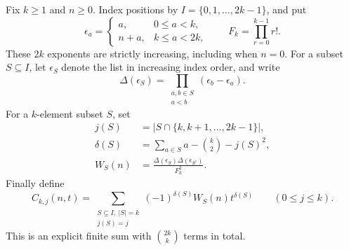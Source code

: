 \documentclass[11pt,a4paper]{article}
\theoremstyle{definition}
\theoremstyle{remark}
\numberwithin{equation}{section}
\begin{document}
Fix \(k\ge1\) and \(n\ge0\). Index positions by
\(I=\{0,1,\ldots,2k-1\}\), and put
\begin{equation}
 \epsilon_a=\begin{cases}a,&0\le a<k,\\ n+a,&k\le a<2k,\end{cases}
 \qquad F_k=\prod_{r=0}^{k-1}r!.
 \label{eq:epsilon}
\end{equation}
These \(2k\) exponents are strictly increasing, including when \(n=0\).
For a subset \(S\subseteq I\), let \(\epsilon_S\) denote the list in
increasing index order, and write
\[
 \Delta(\epsilon_S)=\prod_{\substack{a,b\in S\\a<b}}
 (\epsilon_b-\epsilon_a).
\]
For a \(k\)-element subset \(S\), set
\begin{align}
 j(S)&=|S\cap\{k,k+1,\ldots,2k-1\}|,\label{eq:jS}\\
 \delta(S)&=\sum_{a\in S}a-\binom{k}{2}-j(S)^2,\label{eq:delta}\\
 W_S(n)&=\frac{\Delta(\epsilon_S)\Delta(\epsilon_{S^c})}{F_k^2}.
 \label{eq:weight}
\end{align}
Finally define
\begin{equation}
 C_{k,j}(n,t)=
 \sum_{\substack{S\subseteq I,\ |S|=k\\j(S)=j}}
 (-1)^{\delta(S)}W_S(n)t^{\delta(S)}
 \qquad(0\le j\le k).
 \label{eq:blocks}
\end{equation}
This is an explicit finite sum with \(\binom{2k}{k}\) terms in total.
\end{document}
